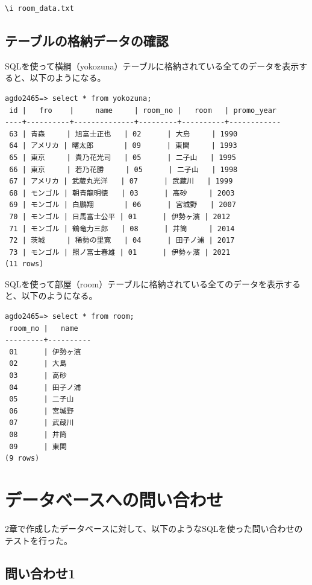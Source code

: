 \documentclass[10pt,a4paper,titlepage]{jreport}
\begin{document}
\begin{lstlisting}[caption=部屋テーブルへの初期データの挿入]
\i room_data.txt
\end{lstlisting}


\section{テーブルの格納データの確認}
SQLを使って横綱（yokozuna）テーブルに格納されている全てのデータを表示すると、以下のようになる。

\begin{verbatim}
agdo2465=> select * from yokozuna;
 id |   fro    |     name     | room_no |   room   | promo_year
----+----------+--------------+---------+----------+------------
 63 | 青森     | 旭富士正也   | 02      | 大島     | 1990
 64 | アメリカ | 曙太郎       | 09      | 東関     | 1993
 65 | 東京     | 貴乃花光司   | 05      | 二子山   | 1995
 66 | 東京     | 若乃花勝     | 05      | 二子山   | 1998
 67 | アメリカ | 武蔵丸光洋   | 07      | 武蔵川   | 1999
 68 | モンゴル | 朝青龍明徳   | 03      | 高砂     | 2003
 69 | モンゴル | 白鵬翔       | 06      | 宮城野   | 2007
 70 | モンゴル | 日馬富士公平 | 01      | 伊勢ヶ濱 | 2012
 71 | モンゴル | 鶴竜力三郎   | 08      | 井筒     | 2014
 72 | 茨城     | 稀勢の里寛   | 04      | 田子ノ浦 | 2017
 73 | モンゴル | 照ノ富士春雄 | 01      | 伊勢ヶ濱 | 2021
(11 rows)
\end{verbatim}
\vspace{3mm}

SQLを使って部屋（room）テーブルに格納されている全てのデータを表示すると、以下のようになる。

\begin{verbatim}
agdo2465=> select * from room;
 room_no |   name
---------+----------
 01      | 伊勢ヶ濱
 02      | 大島
 03      | 高砂
 04      | 田子ノ浦
 05      | 二子山
 06      | 宮城野
 07      | 武蔵川
 08      | 井筒
 09      | 東関
(9 rows)
\end{verbatim}
\vspace{3mm}


\chapter{データベースへの問い合わせ}

2章で作成したデータベースに対して、以下のようなSQLを使った問い合わせのテストを行った。

\section{問い合わせ1}
\end{document}
